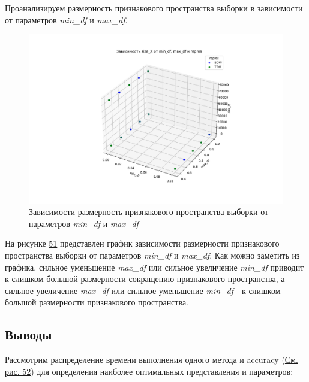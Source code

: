 \documentclass[14pt]{extarticle}
\begin{document}
Проанализируем размерность признакового пространства выборки в зависимости от параметров \textit{min\_df} и \textit{max\_df}.

\begin{figure}[H]
    \centering
    \includegraphics[width=0.85\linewidth]
    {exp_8_min_max_df_size.pdf}
    \caption{Зависимости размерность признакового пространства выборки от параметров \textit{min\_df} и \textit{max\_df}}
    \label{fig:exp_8_min_max_df_size}
\end{figure}

На рисунке \hyperref[fig:exp_8_min_max_df_size]{51} представлен график зависимости размерности признакового пространства выборки от параметров \textit{min\_df} и \textit{max\_df}. Как можно заметить из графика, сильное уменьшение \textit{max\_df} или сильное увеличение \textit{min\_df} приводит к слишком большой размерности сокращению признакового пространства, а сильное увеличение \textit{max\_df} или сильное уменьшение \textit{min\_df} - к слишком большой размерности признакового пространства.

\subsection{Выводы}

Рассмотрим распределение времени выполнения одного метода и accuracy (\hyperref[fig:exp_8_min_max_df_time_acc_raspred]{См. рис. 52}) для определения наиболее оптимальных представления и параметров:
\end{document}
